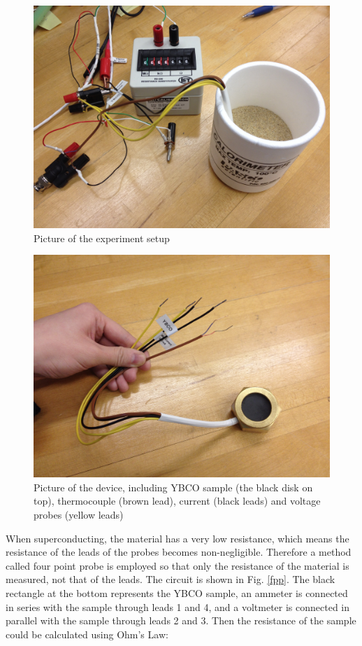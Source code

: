\documentclass[prb,preprint]{revtex4-1}
\begin{document}
\begin{figure}[h]
\centering
\includegraphics[width=16cm]{ybcosetup.jpg}
\caption{Picture of the experiment setup}
\label{setup}
\end{figure}

\begin{figure}[h]
\centering
\includegraphics[width=16cm]{ybcosample.jpg}
\caption{Picture of the device, including YBCO sample (the black disk on top), thermocouple (brown lead), current (black leads) and voltage probes (yellow leads)}
\label{sample}
\end{figure}

When superconducting, the material has a very low resistance, which means the resistance of the leads of the probes becomes non-negligible. Therefore a method called four point probe is employed so that only the resistance of the material is measured, not that of the leads. The circuit is shown in Fig. \ref{fpp}. The black rectangle at the bottom represents the YBCO sample, an ammeter is connected in series with the sample through leads 1 and 4, and a voltmeter is connected in parallel with the sample through leads 2 and 3. Then the resistance of the sample could be calculated using Ohm's Law:
\end{document}
